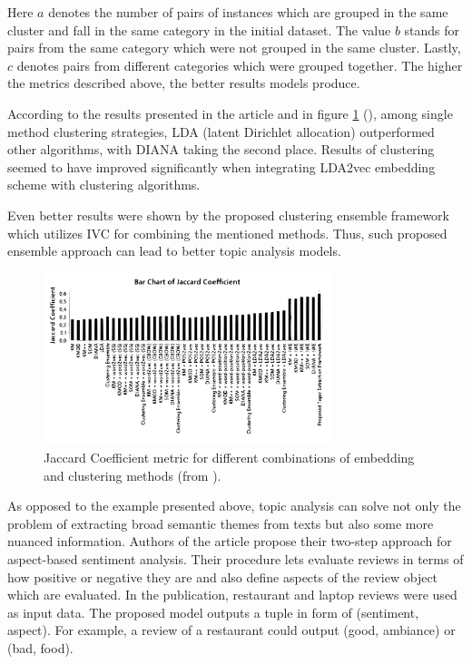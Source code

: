 \documentclass[13pt, a4paper]{article}
\begin{document}
Here $a$ denotes the number of pairs of instances which are grouped in the same cluster and fall in the same category in the initial dataset. The value $b$ stands for pairs from the same category which were not grouped in the same cluster. Lastly, $c$ denotes pairs from different categories which were grouped together. The higher the metrics described above, the better results models produce.

According to the results presented in the article and in figure \ref{fig:gr1} (\cite{onan2019two}), among single method clustering strategies, LDA (latent Dirichlet allocation) outperformed other algorithms, with DIANA taking the second place. Results of clustering seemed to have improved significantly when integrating LDA2vec embedding scheme with clustering algorithms.

Even better results were shown by the proposed clustering ensemble framework which utilizes IVC for combining the mentioned methods. Thus, such proposed ensemble approach can lead to better topic analysis models.

\begin{figure}[!h]\vspace*{4pt}
	\centerline{\includegraphics[width=0.75\textwidth]{./visuals/gr1.pdf}}
	\caption{Jaccard Coefficient metric for different combinations of embedding and clustering methods (from \cite{onan2019two}).}
\label{fig:gr1}
\end{figure}

As opposed to the example presented above, topic analysis can solve not only the problem of extracting broad semantic themes from texts but also some more nuanced information. Authors of the article \cite{huang2020weakly} propose their two-step approach for aspect-based sentiment analysis. Their procedure lets evaluate reviews in terms of how positive or negative they are and also define aspects of the review object which are evaluated. In the publication, restaurant and laptop reviews were used as input data. The proposed model outputs a tuple in form of (sentiment, aspect). For example, a review of a restaurant could output (good, ambiance) or (bad, food).
\end{document}
